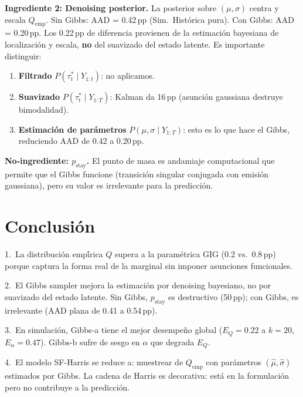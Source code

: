 \documentclass[12pt,letterpaper]{article}
\newcommand{\pstay}{p_{\text{stay}}}
\begin{document}
\textbf{Ingrediente 2: Denoising posterior.}
La posterior sobre $(\mu, \sigma)$ centra y escala $Q_{\text{emp}}$. Sin Gibbs: AAD = 0.42\,pp (Sim.\ Hist\'{o}rica pura). Con Gibbs: AAD = 0.20\,pp. Los 0.22\,pp de diferencia provienen de la estimaci\'{o}n bayesiana de localizaci\'{o}n y escala, \textbf{no} del suavizado del estado latente. Es importante distinguir:
\begin{enumerate}
    \item \textbf{Filtrado} $P(\tau_t^* \mid Y_{1:t})$: no aplicamos.
    \item \textbf{Suavizado} $P(\tau_t^* \mid Y_{1:T})$: Kalman da 16\,pp (asunci\'{o}n gaussiana destruye bimodalidad).
    \item \textbf{Estimaci\'{o}n de par\'{a}metros} $P(\mu, \sigma \mid Y_{1:T})$: esto es lo que hace el Gibbs, reduciendo AAD de 0.42 a 0.20\,pp.
\end{enumerate}

\textbf{No-ingrediente: $\pstay$.}
El punto de masa es andamiaje computacional que permite que el Gibbs funcione (transici\'{o}n singular conjugada con emisi\'{o}n gaussiana), pero su valor es irrelevante para la predicci\'{o}n.

\section{Conclusi\'{o}n}

1.~La distribuci\'{o}n emp\'{\'i}rica $Q$ supera a la param\'{e}trica GIG (0.2 vs.\ 0.8\,pp) porque captura la forma real de la marginal sin imponer asunciones funcionales.

2.~El Gibbs sampler mejora la estimaci\'{o}n por denoising bayesiano, no por suavizado del estado latente. Sin Gibbs, $\pstay$ es destructivo (50\,pp); con Gibbs, es irrelevante (AAD plana de 0.41 a 0.54\,pp).

3.~En simulaci\'{o}n, Gibbs-a tiene el mejor desempe\~{n}o global ($E_Q = 0.22$ a $k=20$, $E_\alpha = 0.47$). Gibbs-b sufre de sesgo en $\alpha$ que degrada $E_Q$.

4.~El modelo SF-Harris se reduce a: muestrear de $Q_{\text{emp}}$ con par\'{a}metros $(\hat{\mu}, \hat{\sigma})$ estimados por Gibbs. La cadena de Harris es decorativa: est\'{a} en la formulaci\'{o}n pero no contribuye a la predicci\'{o}n.



\end{document}
